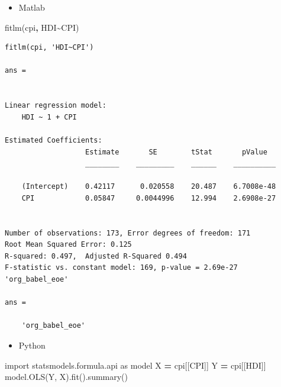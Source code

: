 \documentclass[
]{book}
\newenvironment{Shaded}{\begin{snugshade}}{\end{snugshade}}
\newcommand{\ImportTok}[1]{#1}
\newcommand{\NormalTok}[1]{#1}
\newcommand{\OperatorTok}[1]{\textcolor[rgb]{0.81,0.36,0.00}{\textbf{#1}}}
\newcommand{\SpecialStringTok}[1]{\textcolor[rgb]{0.31,0.60,0.02}{#1}}
\newcommand{\StringTok}[1]{\textcolor[rgb]{0.31,0.60,0.02}{#1}}
\newcommand{\VariableTok}[1]{\textcolor[rgb]{0.00,0.00,0.00}{#1}}
\providecommand{\tightlist}{%
  \setlength{\itemsep}{0pt}\setlength{\parskip}{0pt}}
\begin{document}
\begin{itemize}
\tightlist
\item
  Matlab
\end{itemize}

\begin{Shaded}
\begin{Highlighting}[]
\VariableTok{fitlm}\NormalTok{(}\VariableTok{cpi}\OperatorTok{,} \SpecialStringTok{\textquotesingle{}HDI\textasciitilde{}CPI\textquotesingle{}}\NormalTok{)}
\end{Highlighting}
\end{Shaded}

\begin{verbatim}
fitlm(cpi, 'HDI~CPI')

ans = 


Linear regression model:
    HDI ~ 1 + CPI

Estimated Coefficients:
                   Estimate       SE        tStat       pValue  
                   ________    _________    ______    __________

    (Intercept)    0.42117      0.020558    20.487    6.7008e-48
    CPI            0.05847     0.0044996    12.994    2.6908e-27


Number of observations: 173, Error degrees of freedom: 171
Root Mean Squared Error: 0.125
R-squared: 0.497,  Adjusted R-Squared 0.494
F-statistic vs. constant model: 169, p-value = 2.69e-27
'org_babel_eoe'

ans =

    'org_babel_eoe'
\end{verbatim}

\begin{itemize}
\tightlist
\item
  Python
\end{itemize}

\begin{Shaded}
\begin{Highlighting}[]
\ImportTok{import}\NormalTok{ statsmodels.formula.api }\ImportTok{as}\NormalTok{ model}
\NormalTok{X }\OperatorTok{=}\NormalTok{ cpi[[}\StringTok{\textquotesingle{}CPI\textquotesingle{}}\NormalTok{]]}
\NormalTok{Y }\OperatorTok{=}\NormalTok{ cpi[[}\StringTok{\textquotesingle{}HDI\textquotesingle{}}\NormalTok{]]}
\NormalTok{model.OLS(Y, X).fit().summary()}
\end{Highlighting}
\end{Shaded}
\end{document}
